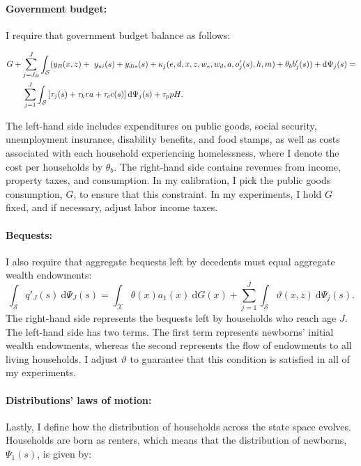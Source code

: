 \documentclass[parskip=full]{article}
\begin{document}
\paragraph{Government budget:} I require that government budget balance as follows:

\begin{align}
   & G + \sum_{j=J_{R}}^J \int_{\mathcal{S}} (y_{R}(x,z)+\ y_{ui}(s)+y_{dis}(s)+\kappa_{j}(e,d,x,z,w_{e},w_{d},a,o'_{j}(s),h,m)+\theta_{b}b'_{j}(s)) + \mathrm{d}\Psi_j(s)= \label{eq:gbc}\\ & \qquad
  \sum_{j=1}^J \int_{\mathcal{S}} \left[\tau_j(s)+\tau_k r a +\tau_{c}c(s)\right] \mathrm{d}\Psi_j(s) + \tau_p p H \notag.
\end{align}

\noindent The left-hand side includes expenditures on public goods, social security, unemployment insurance, disability benefits, and food stamps, as well as costs associated with each household experiencing homelessness, where I denote the cost per households by $\theta_{b}$. The right-hand side contains revenues from income, property taxes, and consumption. In my calibration, I pick the public goods consumption, $G$, to ensure that this constraint. In my experiments, I hold $G$ fixed, and if necessary, adjust labor income taxes.

\paragraph{Bequests:} I also require that aggregate bequests left by decedents must equal aggregate wealth endowments:
\begin{equation}
\label{eq:agg_bequests}
      \int_{\mathcal{S}} q'_J(s)\ \mathrm{d}\Psi_J(s) = \int_{\mathcal{X}} \theta(x)a_1(x)\ \mathrm{d}G(x) + \sum_{j=1}^J \int_{\mathcal{S}} \vartheta (x,z)\ \mathrm{d}\Psi_j(s).
\end{equation}
The right-hand side represents the bequests left by households who reach age $J$. The left-hand side has two terms. The first term represents newborns' initial wealth endowments, whereas the second represents the flow of endowments to all living households. I adjust $\vartheta$ to guarantee that this condition is satisfied in all of my experiments. 

\paragraph{Distributions' laws of motion:} Lastly, I define how the distribution of households across the state space evolves. Households are born as renters, which means that the distribution of newborns, $\Psi_1(s)$, is given by:
\end{document}
